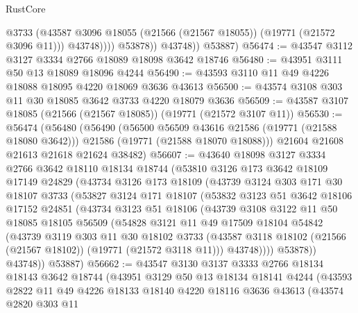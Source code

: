 \begin{lexlean}{RustCore}
\begin{coremodule}
                      @3733
                      (@43587 @3096 @18055 (@21566 (@21567 @18055)) (@19771 (@21572 @3096 @11)))
                      @43748))))
              @53878))
          @43748))
      @53887)
@56474 := @43547 @3112 @3127 @3334 @2766 @18089 @18098 @3642 @18746
@56480 := @43951 @3111 @50 @13 @18089 @18096 @4244
@56490 := @43593 @3110 @11 @49 @4226 @18088 @18095 @4220 @18069 @3636 @43613
@56500 := @43574 @3108 @303 @11 @30 @18085 @3642 @3733 @4220 @18079 @3636
@56509 := @43587 @3107 @18085 (@21566 (@21567 @18085)) (@19771 (@21572 @3107 @11))
@56530 := @56474
    (@56480
      (@56490
        (@56500 @56509 @43616 @21586 (@19771 (@21588 @18080 @3642)))
        @21586
        (@19771 (@21588 @18070 @18088)))
      @21604
      @21608
      @21613
      @21618
      @21624
      @38482)
@56607 := @43640
    @18098
    @3127
    @3334
    @2766
    @3642
    @18110
    @18134
    @18744
    (@53810
      @3126
      @173
      @3642
      @18109
      @17149
      @24829
      (@43734
        @3126
        @173
        @18109
        (@43739
          @3124
          @303
          @171
          @30
          @18107
          @3733
          (@53827
            @3124
            @171
            @18107
            (@53832
              @3123
              @51
              @3642
              @18106
              @17152
              @24851
              (@43734
                @3123
                @51
                @18106
                (@43739
                  @3108
                  @3122
                  @11
                  @50
                  @18085
                  @18105
                  @56509
                  (@54828
                    @3121
                    @11
                    @49
                    @17509
                    @18104
                    @54842
                    (@43739
                      @3119
                      @303
                      @11
                      @30
                      @18102
                      @3733
                      (@43587 @3118 @18102 (@21566 (@21567 @18102)) (@19771 (@21572 @3118 @11)))
                      @43748))))
              @53878))
          @43748))
      @53887)
@56662 := @43547
    @3130
    @3137
    @3333
    @2766
    @18134
    @18143
    @3642
    @18744
    (@43951
      @3129
      @50
      @13
      @18134
      @18141
      @4244
      (@43593
        @2822
        @11
        @49
        @4226
        @18133
        @18140
        @4220
        @18116
        @3636
        @43613
        (@43574
          @2820
          @303
          @11

\end{coremodule}
\end{lexlean}
